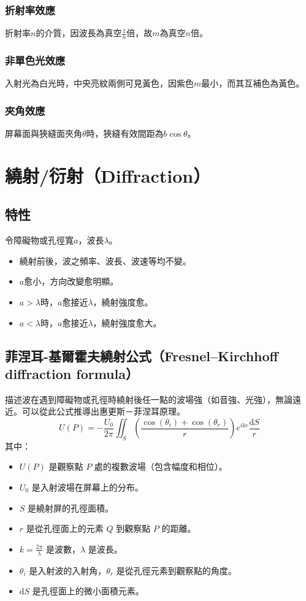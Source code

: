 \documentclass[a4paper,12pt]{report}
\begin{document}
\subsubsection{折射率效應}
折射率$n$的介質，因波長為真空$\frac{1}{n}$倍，故$m$為真空$n$倍。
\subsubsection{非單色光效應}
入射光為白光時，中央亮紋兩側可見黃色，因紫色$m$最小，而其互補色為黃色。
\subsubsection{夾角效應}
屏幕面與狹縫面夾角$\theta$時，狹縫有效間距為$b\cos\theta$。


\section{繞射/衍射（Diffraction）}
\subsection{特性}
令障礙物或孔徑寬$a$，波長$\lambda$。
\begin{itemize}
\item 繞射前後，波之頻率、波長、波速等均不變。
\item $a$愈小，方向改變愈明顯。
\item $a>\lambda$時，$a$愈接近$\lambda$，繞射強度愈。
\item $a<\lambda$時，$a$愈接近$\lambda$，繞射強度愈大。
\end{itemize}
\subsection{菲涅耳-基爾霍夫繞射公式（Fresnel–Kirchhoff diffraction formula）}
描述波在遇到障礙物或孔徑時繞射後任一點的波場強（如音強、光強），無論遠近。可以從此公式推導出惠更斯－菲涅耳原理。
\[
U(P) = -\frac{U_0}{2\pi} \iint_S \left(\frac{\cos(\theta_i) + \cos(\theta_r)}{r} \right) e^{ikr} \frac{\mathrm{d}S}{r}
\]
其中：
\begin{itemize}
\item \( U(P) \) 是觀察點 \( P \) 處的複數波場（包含幅度和相位）。
\item \( U_0 \) 是入射波場在屏幕上的分布。
\item \( S \) 是繞射屏的孔徑面積。
\item  \( r \) 是從孔徑面上的元素 \( Q \) 到觀察點 \( P \) 的距離。
\item  \( k = \frac{2\pi}{\lambda} \) 是波數，\( \lambda \) 是波長。
\item  \( \theta_i \) 是入射波的入射角，\( \theta_r \) 是從孔徑元素到觀察點的角度。
\item  \( \mathrm{d}S \) 是孔徑面上的微小面積元素。
\end{itemize}
\end{document}
